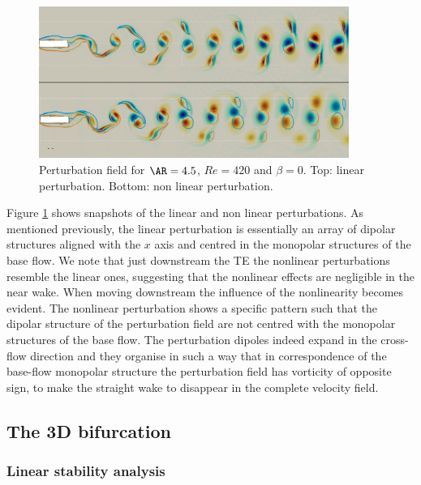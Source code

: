 \begin{figure}
  \centering
  \includegraphics[width=0.9\textwidth]{./fig/AR4p5/nl_Re420.png}
  \caption{Perturbation field for $\AR=4.5$, $Re=420$ and $\beta=0$. Top: linear perturbation. Bottom: non linear perturbation.}
  \label{fig:pert-nl}
\end{figure}

Figure \ref{fig:pert-nl} shows snapshots of the linear and non linear perturbations. As mentioned previously, the linear perturbation is essentially an array of dipolar structures aligned with the $x$ axis and centred in the monopolar structures of the base flow. We note that just downstream the TE the nonlinear perturbations resemble the linear ones, suggesting that the nonlinear effects are negligible in the near wake. When moving downstream the influence of the nonlinearity becomes evident. The nonlinear perturbation shows a specific pattern such that the dipolar structure of the perturbation field are not centred with the monopolar structures of the base flow. The perturbation dipoles indeed expand in the cross-flow direction and they organise in such a way that in correspondence of the base-flow monopolar structure the perturbation field has vorticity of opposite sign, to make the straight wake to disappear in the complete velocity field.

\subsection{The 3D bifurcation}

\subsubsection{Linear stability analysis}

